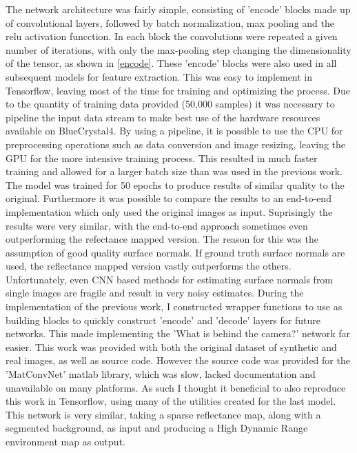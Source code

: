 \documentclass[ %
                    author={Gavin Parker},
                supervisor={Dr. Neill Campbell},
                    degree={MEng},
                     title={Deep Siamese Networks for Illumination Estimation from Stereo Images},
                  subtitle={},
                      type={research},
                      year={2018} ]{dissertation}
\begin{document}
The network architecture was fairly simple, consisting of 'encode' blocks made up of convolutional layers, followed by batch normalization, max pooling and the relu activation funcction. In each block the convolutions were repeated a given number of iterations, with only the max-pooling step changing the dimensionality of the tensor, as shown in \ref{encode}. These 'encode' blocks were also used in all subsequent models for feature extraction. This was easy to implement in Tensorflow, leaving most of the time for training and optimizing the process. Due to the quantity of training data provided (50,000 samples) it was necessary to pipeline the input data stream to make best use of the hardware resources available on BlueCrystal4. By using a pipeline, it is possible to use the CPU for preprocessing operations such as data conversion and image resizing, leaving the GPU for the more intensive training process. This resulted in much faster training and allowed for a larger batch size than was used in the previous work. The model was trained for 50 epochs to produce results of similar quality to the original. Furthermore it was possible to compare the results to an end-to-end implementation which only used the original images as input. Suprisingly the results were very similar, with the end-to-end approach sometimes even outperforming the refectance mapped version. The reason for this was the assumption of good quality surface normals. If ground truth surface normals are used, the reflectance mapped version vastly outperforms the others. Unfortunately, even CNN based methods for estimating surface normals from single images are fragile and result in very noisy estimates.
\newline
During the implementation of the previous work, I constructed wrapper functions to use as building blocks to quickly construct 'encode' and 'decode' layers for future networks. This made implementing the 'What is behind the camera?' network far easier. This work was provided with both the original dataset of synthetic and real images, as well as source code. However the source code was provided for the 'MatConvNet' matlab library, which was slow, lacked documentation and unavailable on many platforms. As such I thought it beneficial to also reproduce this work in Tensorflow, using many of the utilities created for the last model. This network is very similar, taking a sparse reflectance map, along with a segmented background, as input and producing a High Dynamic Range environment map as output.
\newline
\end{document}
